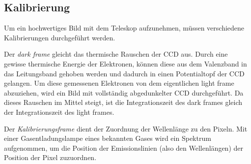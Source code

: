 \subsection{Kalibrierung}
Um ein hochwertiges Bild mit dem Teleskop aufzunehmen, müssen verschiedene Kalibrierungen durchgeführt werden.

Der \textit{dark frame} gleicht das thermische Rauschen der CCD aus.
Durch eine gewisse thermische Energie der Elektronen, können diese aus dem Valenzband in das Leitungsband gehoben werden und dadurch in einen Potentialtopf der CCD gelangen.
Um diese gemessenen Elektronen von dem eigentlichen light frame abzuziehen, wird ein Bild mit vollständig abgedunkelter CCD durchgeführt.
Da dieses Rauschen im Mittel steigt, ist die Integrationszeit des dark frames gleich der Integrationszeit des light frames.

Der \textit{Kalibrierungsframe} dient der Zuordnung der Wellenlänge zu den Pixeln.
Mit einer Gasentladungslampe eines bekannten Gases wird ein Spektrum aufgenommen, um die Position der Emissionslinien (also den Wellenlängen) der Position der Pixel zuzuordnen.

\iffalse
Der \textit{FLAT frame} dient zur Korrektur der Pixelempfindlichkeit auf der CCD.
Da nicht jeder Pixel die gleiche Lichtempfindlichkeit aufweist und diese durch Staub oder Unreinheiten stark beeinträchtigt wird, wird ein frame mit vollständig ausgeleuchteter CCD aufgenommen.
Dieser frame wird durch den -- bereits mit dem dark frame korrigierten -- light frame geteilt, um jeden Pixel auf seine Empfindlichkeit zu normieren.
\fi
